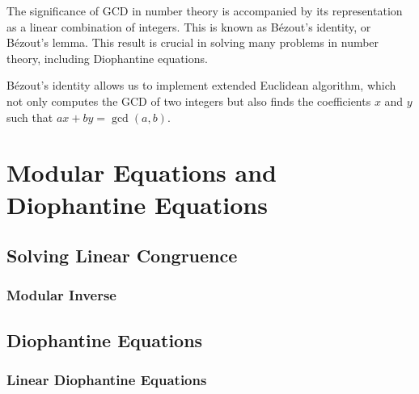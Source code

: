 \documentclass[oneside]{book}
\begin{document}
The significance of GCD in number theory is accompanied by its representation as a linear combination of integers. This is known as Bézout's identity, or Bézout's lemma. This result is crucial in solving many problems in number theory, including Diophantine equations.


Bézout's identity allows us to implement extended Euclidean algorithm, which not only computes the GCD of two integers but also finds the coefficients \(x\) and \(y\) such that \(ax + by = \gcd(a, b)\).

\chapter{Modular Equations and Diophantine Equations}
\section{Solving Linear Congruence}
\subsection{Modular Inverse}
\section{Diophantine Equations}
\subsection{Linear Diophantine Equations}
\end{document}
